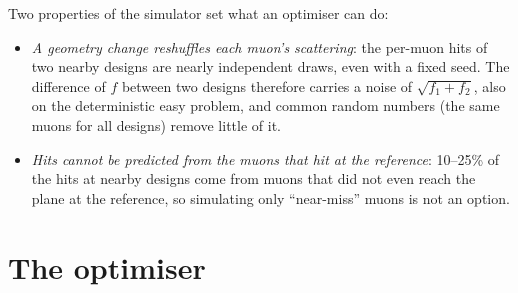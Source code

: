 \documentclass[11pt,a4paper]{article}
\begin{document}
Two properties of the simulator set what an optimiser can do:
\begin{itemize}
  \item \emph{A geometry change reshuffles each muon's scattering}: the per-muon hits of two nearby
        designs are nearly independent draws, even with a fixed seed. The difference of $f$
        between two designs therefore carries a noise of $\sqrt{f_1+f_2}$, also on the
        deterministic easy problem, and common random numbers (the same muons for all designs)
        remove little of it.
  \item \emph{Hits cannot be predicted from the muons that hit at the reference}: 10--25\% of the
        hits at nearby designs come from muons that did not even reach the plane at the reference,
        so simulating only ``near-miss'' muons is not an option.
\end{itemize}

\section{The optimiser}
\end{document}
